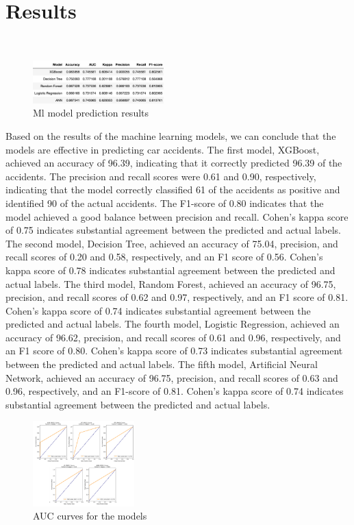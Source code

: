 \documentclass{IEEEtran}
\begin{document}
\section{Results }
\

\begin{figure}[htbp]
\centering
\includegraphics[width=0.45\textwidth]{res.png}
\caption{\label{fig:res}Ml model prediction results    }
\end{figure}



Based on the results of the machine learning models, we can conclude that the models are effective in predicting car accidents. The first model, XGBoost, achieved an accuracy of 96.39\text{\%}, indicating that it correctly predicted 96.39\text{\%} of the accidents. The precision and recall scores were 0.61 and 0.90, respectively, indicating that the model correctly classified 61\text{\%} of the accidents as positive and identified 90\text{\%} of the actual accidents. The F1-score of 0.80 indicates that the model achieved a good balance between precision and recall. Cohen's kappa score of 0.75 indicates substantial agreement between the predicted and actual labels. The second model, Decision Tree, achieved an accuracy of 75.04\text{\%}, precision, and recall scores of 0.20 and 0.58, respectively, and an F1 score of 0.56. Cohen's kappa score of 0.78 indicates substantial agreement between the predicted and actual labels. The third model, Random Forest, achieved an accuracy of 96.75\text{\%}, precision, and recall scores of 0.62 and 0.97, respectively, and an F1 score of 0.81. Cohen's kappa score of 0.74 indicates substantial agreement between the predicted and actual labels. The fourth model, Logistic Regression, achieved an accuracy of 96.62\text{\%}, precision, and recall scores of 0.61 and 0.96, respectively, and an F1 score of 0.80. Cohen's kappa score of 0.73 indicates substantial agreement between the predicted and actual labels. The fifth model, Artificial Neural Network, achieved an accuracy of 96.75\text{\%}, precision, and recall scores of 0.63 and 0.96, respectively, and an F1-score of 0.81. Cohen's kappa score of 0.74 indicates substantial agreement between the predicted and actual labels.


\begin{figure}[h]
\centering
\includegraphics[width=0.35\textwidth]{aucc.png}
\caption{\label{fig:aucc}AUC curves for the models  }
\end{figure}
\end{document}
